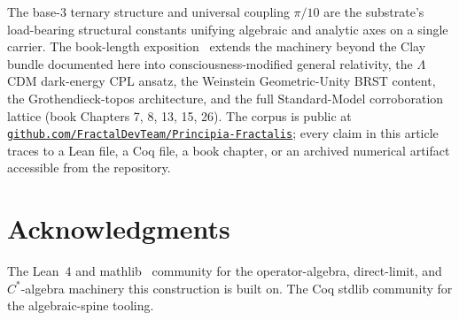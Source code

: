 \documentclass[11pt,a4paper]{amsart}
\theoremstyle{plain}
\theoremstyle{definition}
\begin{document}
The base-3 ternary structure and universal coupling $\pi/10$ are the substrate's load-bearing structural constants unifying algebraic and analytic axes on a single carrier. The book-length exposition~\cite{cohen2026book} extends the machinery beyond the Clay bundle documented here into consciousness-modified general relativity, the $\Lambda$CDM dark-energy CPL ansatz, the Weinstein Geometric-Unity BRST content, the Grothendieck-topos architecture, and the full Standard-Model corroboration lattice (book Chapters 7, 8, 13, 15, 26). The corpus is public at \href{https://github.com/FractalDevTeam/Principia-Fractalis}{\texttt{github.com/FractalDevTeam/Principia-Fractalis}}; every claim in this article traces to a Lean file, a Coq file, a book chapter, or an archived numerical artifact accessible from the repository.

\section*{Acknowledgments}

The Lean~4 and mathlib~\cite{moura-ullrich2021,mathlib2020} community for the operator-algebra, direct-limit, and $C^*$-algebra machinery this construction is built on. The Coq stdlib community for the algebraic-spine tooling.
\end{document}
